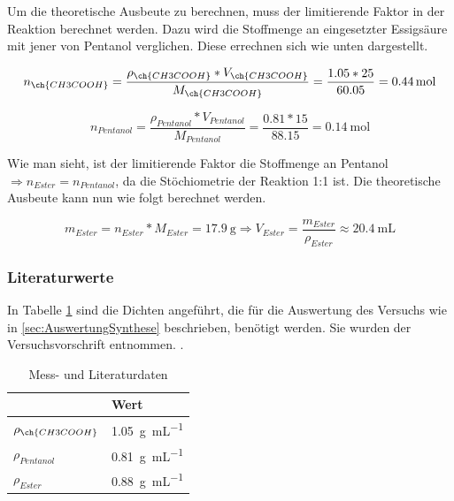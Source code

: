 \documentclass{article}
\begin{document}
        Um die theoretische Ausbeute zu berechnen, muss der limitierende Faktor in der Reaktion berechnet werden. Dazu wird die Stoffmenge an eingesetzter Essigsäure mit jener von Pentanol verglichen. Diese errechnen sich wie unten dargestellt.
        
        \begin{equation}
          n_{\ch{CH3COOH}} = \frac{\rho_{\ch{CH3COOH}} * V_{\ch{CH3COOH}}}{M_{\ch{CH3COOH}}} = \frac{1.05 * 25}{60.05} = \SI[mode=text]{0.44}{\mole}   
        \end{equation}
        
        \begin{equation}
          n_{Pentanol} = \frac{\rho_{Pentanol} * V_{Pentanol}}{M_{Pentanol}} = \frac{0.81 * 15}{88.15} = \SI[mode=text]{0.14}{\mole}   
        \end{equation}
        
        Wie man sieht, ist der limitierende Faktor die Stoffmenge an Pentanol $\Rightarrow n_{Ester} = n_{Pentanol}$, da die Stöchiometrie der Reaktion 1:1 ist. Die theoretische Ausbeute kann nun wie folgt berechnet werden.
        
        \begin{equation}
          m_{Ester} = n_{Ester} * M_{Ester} = \SI[mode=text]{17.9}{\gram} \Rightarrow V_{Ester} = \frac{m_{Ester}}{\rho_{Ester}} \approx \SI[mode=text]{20.4}{\milli\liter}
        \end{equation}
      
      \subsubsection{Literaturwerte}
    
        In Tabelle \ref{tab:Messdaten} sind die Dichten angeführt, die für die Auswertung des Versuchs wie in  \ref{sec:AuswertungSynthese} beschrieben, benötigt werden. Sie wurden der Versuchsvorschrift entnommen. \citep{Versuchsvorschrift}.
      
        \begin{table}[H]
          \centering
          \caption[Mess- und Literaturdaten, Quelle: Autor]{Mess- und Literaturdaten}
          \label{tab:Messdaten}
          \begin{tabular}{@{}ll@{}}
            \toprule
              & Wert \\ \midrule
             $\rho_{\ch{CH3COOH}}$ & \SI[mode=text]{1.05}{\gram\per\milli\liter} \\
             $\rho_{Pentanol}$ & \SI[mode=text]{0.81}{\gram\per\milli\liter} \\
             $\rho_{Ester}$ & \SI[mode=text]{0.88}{\gram\per\milli\liter} \\ \bottomrule
          \end{tabular}
      \end{table}      
     
\end{document}
